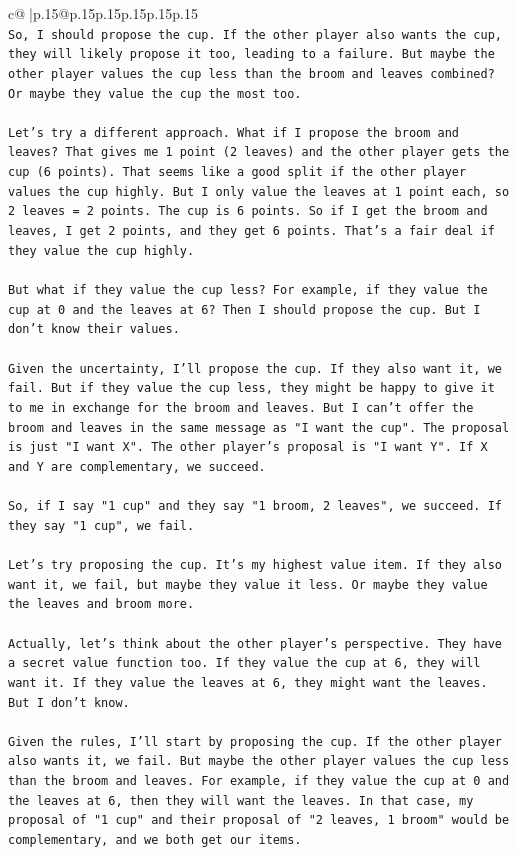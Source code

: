 \documentclass{article}
\begin{document}
{\begin{supertabular}{c@{$\;$}|p{.15\linewidth}@{}p{.15\linewidth}p{.15\linewidth}p{.15\linewidth}p{.15\linewidth}p{.15\linewidth}}
{{{\\ 
\texttt{So, I should propose the cup. If the other player also wants the cup, they will likely propose it too, leading to a failure. But maybe the other player values the cup less than the broom and leaves combined? Or maybe they value the cup the most too.} \\
\\ 
\texttt{Let's try a different approach. What if I propose the broom and leaves? That gives me 1 point (2 leaves) and the other player gets the cup (6 points). That seems like a good split if the other player values the cup highly. But I only value the leaves at 1 point each, so 2 leaves = 2 points. The cup is 6 points. So if I get the broom and leaves, I get 2 points, and they get 6 points. That's a fair deal if they value the cup highly.} \\
\\ 
\texttt{But what if they value the cup less? For example, if they value the cup at 0 and the leaves at 6? Then I should propose the cup. But I don't know their values.} \\
\\ 
\texttt{Given the uncertainty, I'll propose the cup. If they also want it, we fail. But if they value the cup less, they might be happy to give it to me in exchange for the broom and leaves. But I can't offer the broom and leaves in the same message as "I want the cup". The proposal is just "I want X". The other player's proposal is "I want Y". If X and Y are complementary, we succeed.} \\
\\ 
\texttt{So, if I say "1 cup" and they say "1 broom, 2 leaves", we succeed. If they say "1 cup", we fail.} \\
\\ 
\texttt{Let's try proposing the cup. It's my highest value item. If they also want it, we fail, but maybe they value it less. Or maybe they value the leaves and broom more.} \\
\\ 
\texttt{Actually, let's think about the other player's perspective. They have a secret value function too. If they value the cup at 6, they will want it. If they value the leaves at 6, they might want the leaves. But I don't know.} \\
\\ 
\texttt{Given the rules, I'll start by proposing the cup. If the other player also wants it, we fail. But maybe the other player values the cup less than the broom and leaves. For example, if they value the cup at 0 and the leaves at 6, then they will want the leaves. In that case, my proposal of "1 cup" and their proposal of "2 leaves, 1 broom" would be complementary, and we both get our items.} \\
}}}
\end{supertabular}}
\end{document}
